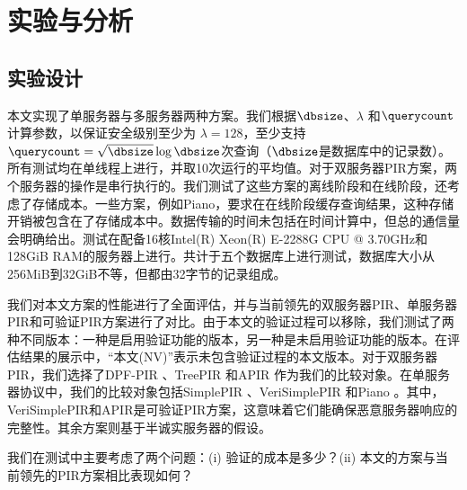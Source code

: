 \section{实验与分析}
\label{sec:evaluation}
\subsection{实验设计}
本文实现了单服务器与多服务器两种方案。我们根据$\dbsize$、$\lambda$ 和$\querycount$计算参数，以保证安全级别至少为 $\lambda=128$，至少支持$\querycount=\sqrt{\dbsize}\log{\dbsize}$次查询（$\dbsize$是数据库中的记录数）。所有测试均在单线程上进行，并取10次运行的平均值。对于双服务器PIR方案，两个服务器的操作是串行执行的。我们测试了这些方案的离线阶段和在线阶段，还考虑了存储成本。一些方案，例如Piano，要求在在线阶段缓存查询结果，这种存储开销被包含在了存储成本中。数据传输的时间未包括在时间计算中，但总的通信量会明确给出。测试在配备16核Intel(R) Xeon(R) E-2288G CPU @ 3.70GHz和128GiB RAM的服务器上进行。共计于五个数据库上进行测试，数据库大小从256MiB到32GiB不等，但都由32字节的记录组成。

我们对本文方案的性能进行了全面评估，并与当前领先的双服务器PIR、单服务器PIR和可验证PIR方案进行了对比。由于本文的验证过程可以移除，我们测试了两种不同版本：一种是启用验证功能的版本，另一种是未启用验证功能的版本。在评估结果的展示中，“本文(NV)”表示未包含验证过程的本文版本。对于双服务器PIR，我们选择了DPF-PIR \cite{EC:GilIsh14}、TreePIR \cite{C:LazPap23}和APIR \cite{APIR}作为我们的比较对象。在单服务器协议中，我们的比较对象包括SimplePIR \cite{SimplePIR}、VeriSimplePIR \cite{VeriSimplePIR}和Piano \cite{Piano}。其中，VeriSimplePIR和APIR是可验证PIR方案，这意味着它们能确保恶意服务器响应的完整性。其余方案则基于半诚实服务器的假设。

我们在测试中主要考虑了两个问题：(i) 验证的成本是多少？(ii) 本文的方案与当前领先的PIR方案相比表现如何？

